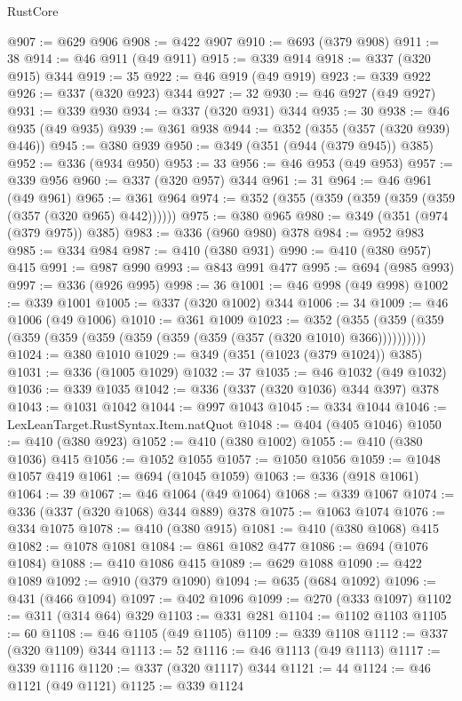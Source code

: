 \begin{lexlean}{RustCore}
\begin{coremodule}
@907 := @629 @906
@908 := @422 @907
@910 := @693 (@379 @908)
@911 := 38
@914 := @46 @911 (@49 @911)
@915 := @339 @914
@918 := @337 (@320 @915) @344
@919 := 35
@922 := @46 @919 (@49 @919)
@923 := @339 @922
@926 := @337 (@320 @923) @344
@927 := 32
@930 := @46 @927 (@49 @927)
@931 := @339 @930
@934 := @337 (@320 @931) @344
@935 := 30
@938 := @46 @935 (@49 @935)
@939 := @361 @938
@944 := @352 (@355 (@357 (@320 @939) @446))
@945 := @380 @939
@950 := @349 (@351 (@944 (@379 @945)) @385)
@952 := @336 (@934 @950)
@953 := 33
@956 := @46 @953 (@49 @953)
@957 := @339 @956
@960 := @337 (@320 @957) @344
@961 := 31
@964 := @46 @961 (@49 @961)
@965 := @361 @964
@974 := @352 (@355 (@359 (@359 (@359 (@359 (@357 (@320 @965) @442))))))
@975 := @380 @965
@980 := @349 (@351 (@974 (@379 @975)) @385)
@983 := @336 (@960 @980) @378
@984 := @952 @983
@985 := @334 @984
@987 := @410 (@380 @931)
@990 := @410 (@380 @957) @415
@991 := @987 @990
@993 := @843 @991 @477
@995 := @694 (@985 @993)
@997 := @336 (@926 @995)
@998 := 36
@1001 := @46 @998 (@49 @998)
@1002 := @339 @1001
@1005 := @337 (@320 @1002) @344
@1006 := 34
@1009 := @46 @1006 (@49 @1006)
@1010 := @361 @1009
@1023 := @352
    (@355 (@359 (@359 (@359 (@359 (@359 (@359 (@359 (@359 (@357 (@320 @1010) @366))))))))))
@1024 := @380 @1010
@1029 := @349 (@351 (@1023 (@379 @1024)) @385)
@1031 := @336 (@1005 @1029)
@1032 := 37
@1035 := @46 @1032 (@49 @1032)
@1036 := @339 @1035
@1042 := @336 (@337 (@320 @1036) @344 @397) @378
@1043 := @1031 @1042
@1044 := @997 @1043
@1045 := @334 @1044
@1046 := LexLeanTarget.RustSyntax.Item.natQuot
@1048 := @404 (@405 @1046)
@1050 := @410 (@380 @923)
@1052 := @410 (@380 @1002)
@1055 := @410 (@380 @1036) @415
@1056 := @1052 @1055
@1057 := @1050 @1056
@1059 := @1048 @1057 @419
@1061 := @694 (@1045 @1059)
@1063 := @336 (@918 @1061)
@1064 := 39
@1067 := @46 @1064 (@49 @1064)
@1068 := @339 @1067
@1074 := @336 (@337 (@320 @1068) @344 @889) @378
@1075 := @1063 @1074
@1076 := @334 @1075
@1078 := @410 (@380 @915)
@1081 := @410 (@380 @1068) @415
@1082 := @1078 @1081
@1084 := @861 @1082 @477
@1086 := @694 (@1076 @1084)
@1088 := @410 @1086 @415
@1089 := @629 @1088
@1090 := @422 @1089
@1092 := @910 (@379 @1090)
@1094 := @635 (@684 @1092)
@1096 := @431 (@466 @1094)
@1097 := @402 @1096
@1099 := @270 (@333 @1097)
@1102 := @311 (@314 @64) @329
@1103 := @331 @281
@1104 := @1102 @1103
@1105 := 60
@1108 := @46 @1105 (@49 @1105)
@1109 := @339 @1108
@1112 := @337 (@320 @1109) @344
@1113 := 52
@1116 := @46 @1113 (@49 @1113)
@1117 := @339 @1116
@1120 := @337 (@320 @1117) @344
@1121 := 44
@1124 := @46 @1121 (@49 @1121)
@1125 := @339 @1124

\end{coremodule}
\end{lexlean}
